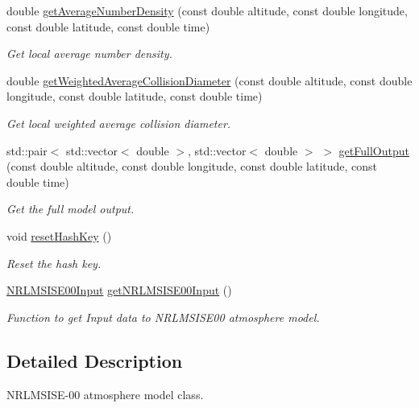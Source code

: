 \begin{DoxyCompactItemize}
double \hyperlink{classtudat_1_1aerodynamics_1_1NRLMSISE00Atmosphere_ac4cc8f6d6362b4ef8fa176412b623215}{get\+Average\+Number\+Density} (const double altitude, const double longitude, const double latitude, const double time)
\begin{DoxyCompactList}\small\item\em Get local average number density. \end{DoxyCompactList}\item 
double \hyperlink{classtudat_1_1aerodynamics_1_1NRLMSISE00Atmosphere_a4af6d0c8273998f75ba8bdc4c2cc4755}{get\+Weighted\+Average\+Collision\+Diameter} (const double altitude, const double longitude, const double latitude, const double time)
\begin{DoxyCompactList}\small\item\em Get local weighted average collision diameter. \end{DoxyCompactList}\item 
std\+::pair$<$ std\+::vector$<$ double $>$, std\+::vector$<$ double $>$ $>$ \hyperlink{classtudat_1_1aerodynamics_1_1NRLMSISE00Atmosphere_ab317008d9d94f2acf51f9fc08a03975e}{get\+Full\+Output} (const double altitude, const double longitude, const double latitude, const double time)
\begin{DoxyCompactList}\small\item\em Get the full model output. \end{DoxyCompactList}\item 
void \hyperlink{classtudat_1_1aerodynamics_1_1NRLMSISE00Atmosphere_afc0f053e11cb133e4821a85f810366f8}{reset\+Hash\+Key} ()
\begin{DoxyCompactList}\small\item\em Reset the hash key. \end{DoxyCompactList}\item 
\hyperlink{structtudat_1_1aerodynamics_1_1NRLMSISE00Input}{N\+R\+L\+M\+S\+I\+S\+E00\+Input} \hyperlink{classtudat_1_1aerodynamics_1_1NRLMSISE00Atmosphere_a00e56dcbeb048a358500a2bef4b359dd}{get\+N\+R\+L\+M\+S\+I\+S\+E00\+Input} ()
\begin{DoxyCompactList}\small\item\em Function to get Input data to N\+R\+L\+M\+S\+I\+S\+E00 atmosphere model. \end{DoxyCompactList}\end{DoxyCompactItemize}


\subsection{Detailed Description}
N\+R\+L\+M\+S\+I\+S\+E-\/00 atmosphere model class. 

